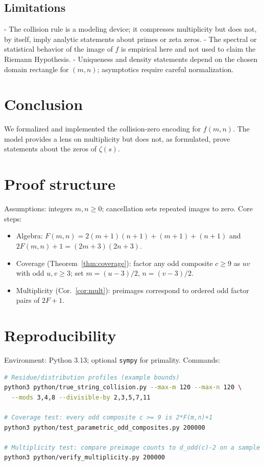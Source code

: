 \documentclass[12pt,a4paper]{article}
\begin{document}
\subsection*{Limitations}
- The collision rule is a modeling device; it compresses multiplicity but does not, by itself, imply analytic statements about primes or zeta zeros.
- The spectral or statistical behavior of the image of \(f\) is empirical here and not used to claim the Riemann Hypothesis.
- Uniqueness and density statements depend on the chosen domain rectangle for \((m,n)\); asymptotics require careful normalization.

\section{Conclusion}
We formalized and implemented the collision-zero encoding for \(f(m,n)\). The model provides a lens on multiplicity but does not, as formulated, prove statements about the zeros of \(\zeta(s)\).

\appendix
\section{Proof structure}
Assumptions: integers \(m,n\ge 0\); cancellation sets repeated images to zero. Core steps:
\begin{itemize}
  \item Algebra: \(F(m,n)=2(m{+}1)(n{+}1)+(m{+}1)+(n{+}1)\) and \(2F(m,n)+1=(2m{+}3)(2n{+}3)\).
  \item Coverage (Theorem~\ref{thm:coverage}): factor any odd composite \(c\ge 9\) as \(uv\) with odd \(u,v\ge 3\); set \(m=(u{-}3)/2\), \(n=(v{-}3)/2\).
  \item Multiplicity (Cor.~\ref{cor:mult}): preimages correspond to ordered odd factor pairs of \(2F{+}1\).
\end{itemize}

\section{Reproducibility}
Environment: Python 3.13; optional \texttt{sympy} for primality. Commands:
\begin{lstlisting}[language=bash]
# Residue/distribution profiles (example bounds)
python3 python/true_string_collision.py --max-m 120 --max-n 120 \
  --mods 3,4,8 --divisible-by 2,3,5,7,11

# Coverage test: every odd composite c >= 9 is 2*F(m,n)+1
python3 python/test_parametric_odd_composites.py 200000

# Multiplicity test: compare preimage counts to d_odd(c)-2 on a sample
python3 python/verify_multiplicity.py 200000
\end{lstlisting}



\end{document}
